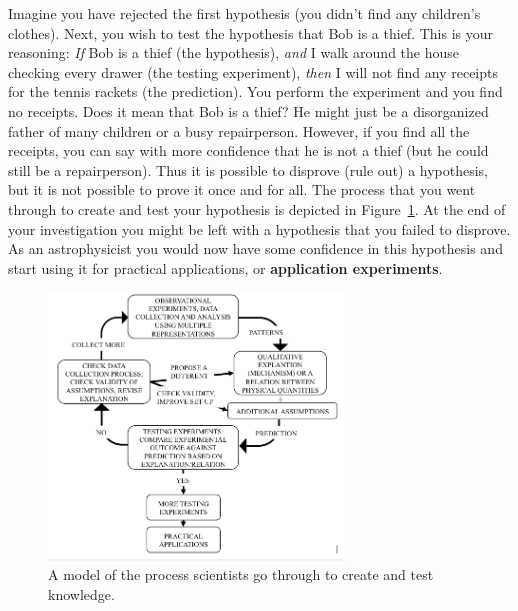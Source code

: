 Imagine you have rejected the first hypothesis (you didn't find any children's clothes). Next, you wish to test the hypothesis that Bob is a thief. This is your reasoning: \textit{If} Bob is a thief (the hypothesis), \textit{and} I walk around the house checking every drawer (the testing experiment), \textit{then} I will not find any receipts for the tennis rackets (the prediction). You perform the experiment and you find no receipts. Does it mean that Bob is a thief? He might just be a disorganized father of many children or a busy repairperson. However, if you find all the receipts, you can say with more confidence that he is not a thief (but he could still be a repairperson). Thus it is possible to disprove (rule out) a hypothesis, but it is not possible to prove it once and for all. The process that you went through to create and test your hypothesis is depicted in Figure~\ref{me:fig:isle}. At the end of your investigation you might be left with a hypothesis that you failed to disprove. As an astrophysicist you would now have some confidence in this hypothesis and start using it for practical applications, or \textbf{application experiments}.

\begin{figure}
	\centering
	\includegraphics[width=0.7\textwidth]{measurement/islegraphic.png}
	\caption{A model of the process scientists go through to create and test knowledge.\cite{etkina_millikan_2015}}\label{me:fig:isle}
\end{figure}

 
